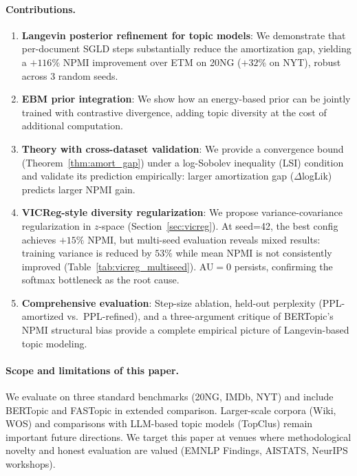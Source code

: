 \documentclass[10pt]{article}
\begin{document}
\paragraph{Contributions.}
\begin{enumerate}
    \item[\textbf{C1.}] \textbf{Langevin posterior refinement for topic models}:
          We demonstrate that per-document SGLD steps substantially reduce the
          amortization gap, yielding a $+116\%$ NPMI improvement over ETM on 20NG
          ($+32\%$ on NYT), robust across 3 random seeds.
    \item[\textbf{C2.}] \textbf{EBM prior integration}:
          We show how an energy-based prior can be jointly trained with
          contrastive divergence, adding topic diversity at the cost of additional
          computation.
    \item[\textbf{C3.}] \textbf{Theory with cross-dataset validation}:
          We provide a convergence bound (Theorem~\ref{thm:amort_gap}) under a
          log-Sobolev inequality (LSI) condition and validate its prediction
          empirically: larger amortization gap ($\Delta$logLik) predicts larger NPMI gain.
    \item[\textbf{C4.}] \textbf{VICReg-style diversity regularization}:
          We propose variance-covariance regularization in $z$-space
          (Section~\ref{sec:vicreg}). At seed=42, the best config achieves $+15\%$ NPMI,
          but multi-seed evaluation reveals mixed results: training variance is reduced by $53\%$
          while mean NPMI is not consistently improved (Table~\ref{tab:vicreg_multiseed}).
          AU$=0$ persists, confirming the softmax bottleneck as the root cause.
    \item[\textbf{C5.}] \textbf{Comprehensive evaluation}:
          Step-size ablation, held-out perplexity (PPL-amortized vs.\ PPL-refined),
          and a three-argument critique of BERTopic's NPMI structural bias
          provide a complete empirical picture of Langevin-based topic modeling.
\end{enumerate}

\paragraph{Scope and limitations of this paper.}
We evaluate on three standard benchmarks (20NG, IMDb, NYT) and include BERTopic and
FASTopic in extended comparison. Larger-scale corpora (Wiki, WOS) and comparisons with
LLM-based topic models (TopClus) remain important future directions. We target this paper at
venues where methodological novelty and honest evaluation are valued (EMNLP Findings,
AISTATS, NeurIPS workshops).
\end{document}
